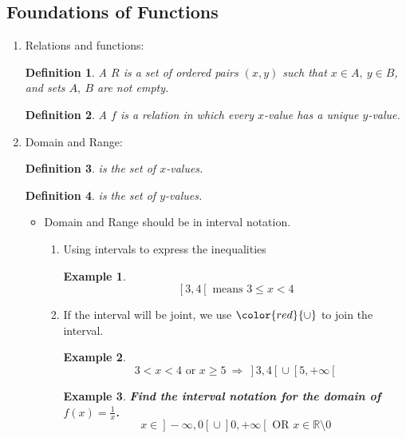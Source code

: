 \documentclass[12pt, a4paper]{article}
\newtheorem{definition}{Definition}[subsection]
\newtheorem{example}{Example}[subsection]
\def\R{{\mathbb{R}}}
\begin{document}
\subsection{Foundations of Functions}
\begin{enumerate}
    \item Relations and functions: 
    \begin{definition}
        A \textbf{\color{red}{relation}} $R$ is a set of ordered pairs $(x,y)$ such that $x\in A,\ y\in B$, and sets $A,\ B$ are not empty. 
    \end{definition}
    \begin{definition}
        A \textbf{\color{red}{function}} $f$ is a relation in which every $x$-value has a unique $y$-value. 
    \end{definition}
    \item Domain and Range: 
    \begin{definition}
        \textbf{\color{red}{Domain}} is the set of $x$-values. 
    \end{definition}
    \begin{definition}
        \textbf{\color{red}{Range}} is the set of $y$-values. 
    \end{definition}
    \begin{itemize}
        \item Domain and Range should be in interval notation. 
        \begin{enumerate}
            \item Using intervals to express the inequalities
            \begin{example}
                $$\left[\right.3,4\left[\right. \text{ means }3\leq x<4$$
            \end{example}
            \item If the interval will be joint, we use ${\color{red}{\cup}}$ to join the interval. 
            \begin{example}
                $$3<x<4\text{ or }x\geq 5\ \Rightarrow\ \left.\right]3,4\left[\right.\cup\left[5,+\infty\right.\left[\right.$$
            \end{example}
            \begin{example}
                \textbf{Find the interval notation for the domain of $\displaystyle f(x)=\frac{1}{x}$.}
                $$x\in\left.\right]-\infty,0\left[\right.\cup\left.\right]0,+\infty\left[\right.\text{ OR } x\in\R\setminus 0$$
                {\color{green}{Note: $\setminus$ means "exclude."}}
            \end{example}

\end{enumerate}
\end{itemize}
\end{enumerate}
\end{document}
